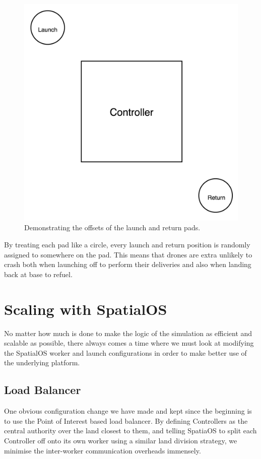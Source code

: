 \documentclass[a4paper,11pt,titlepage]{report}
\begin{document}
\begin{figure}[!hbpt]
  \center
  \includegraphics[width=\linewidth]{img/launchpads.png}
  \caption{Demonstrating the offsets of the launch and return pads.}
  \label{fig:launchpads}
\end{figure}

By treating each pad like a circle, every launch and return position is randomly assigned to somewhere on the pad. This means that drones are extra unlikely to crash both when launching off to perform their deliveries and also when landing back at base to refuel.

\chapter{Scaling with SpatialOS}
No matter how much is done to make the logic of the simulation as efficient and scalable as possible, there always comes a time where we must look at modifying the SpatialOS worker and launch configurations in order to make better use of the underlying platform.

\section{Load Balancer}
One obvious configuration change we have made and kept since the beginning is to use the Point of Interest based load balancer. By defining Controllers as the central authority over the land closest to them, and telling SpatiaOS to split each Controller off onto its own worker using a similar land division strategy, we minimise the inter-worker communication overheads immensely.\\
\end{document}
